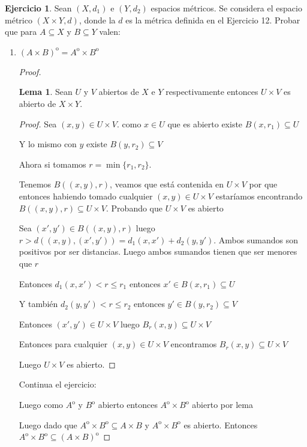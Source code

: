 \documentclass[11pt]{report}
\newcommand{\open}{\mathrm{o}}
\theoremstyle{definition}
\newtheorem{lemma}[theorem]{Lema}
\newtheorem{ej}{Ejercicio}
\begin{document}
\begin{ej}
  Sean $(X,d_{1})$ e $(Y,d_{2})$ espacios métricos. Se considera el espacio métrico $(X \times Y , d)$, donde la $d$ es la métrica definida en el Ejercicio 12. Probar que para $A \subseteq X$ y $B \subseteq Y$ valen: 
  \begin{enumerate}
    \item $(A\times B)^{\open} = A^{\open} \times B^{\open}$
      \begin{proof}
	      \begin{lemma}
	Sean $U$ y $V$ abiertos de $X$ e $Y$ respectivamente entonces $U \times V$ es abierto de $X\times Y$.

\begin{proof}
	



	
	Sea $(x,y) \in U \times V$. como $x \in U$ que es abierto existe $B(x,r_{1}) \subseteq U$ 

	Y lo mismo con $y$ existe $B(y,r_{2}) \subseteq V$

	Ahora si tomamos $r = \min{\{r_{1},r_{2}\}}$. 

	Tenemos $B((x,y),r)$, veamos que está contenida en $U \times V$ por que entonces habiendo tomado cualquier $(x,y) \in U\times V$ estaríamos encontrando $B((x,y),r)\subseteq U\times V$. Probando que $U \times V$ es abierto

	Sea $(x',y') \in B((x,y),r)$ luego $ r > d((x,y),(x',y')) = d_{1}(x,x') + d_{2}(y,y') $. Ambos sumandos son positivos por ser distancias. Luego ambos sumandos tienen que ser menores que $r$

	Entonces $d_{1}(x,x') < r \leq r_{1} $ entonces $x' \in B(x,r_{1}) \subseteq U$

	Y también $d_{2}(y,y') < r \leq r_{2}$ entonces $y' \in B(y,r_{2}) \subseteq V$

	Entonces $(x',y') \in U \times V$ luego $B_{r}(x,y) \subseteq U \times V$

	Entonces para cualquier $(x,y) \in U \times V$ encontramos $B_{r}(x,y) \subseteq U \times V$

	Luego $U \times V$ es abierto.
\end{proof}
\end{lemma}

Continua el ejercicio:

	Luego como $A^{\open}$ y $B^{\open}$ abierto entonces $A^{\open} \times B^{\open}$ abierto por lema

	Luego dado que $A^{\open} \times B^{\open} \subseteq A \times B$ y $A^{\open} \times B^{\open}$ es abierto. Entonces $A^{\open} \times B^{\open} \subseteq (A \times B)^{\open}$


\end{proof}
\end{enumerate}
\end{ej}
\end{document}
